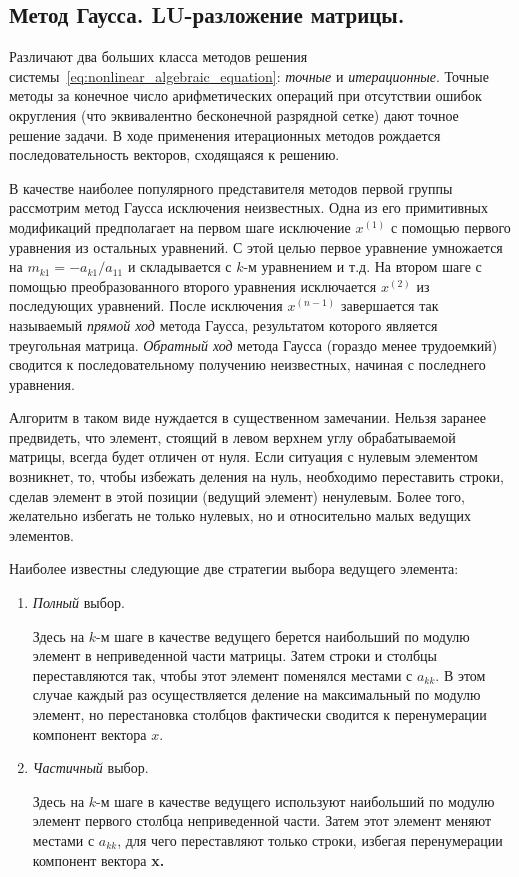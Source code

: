 \documentclass[../../calc-math-exam-2023.tex]{subfiles}
\begin{document}
    \subsection{Метод Гаусса. \textbf{LU}-разложение матрицы.}
    Различают два больших класса методов решения системы~\eqref{eq:nonlinear_algebraic_equation}: \emph{точные} и
    \emph{итерационные}. Точные методы за конечное число арифметических операций при отсутствии ошибок округления
    (что эквивалентно бесконечной разрядной сетке) дают точное решение задачи. В ходе применения итерационных методов
    рождается последовательность векторов, сходящаяся к решению.

    В качестве наиболее популярного представителя методов первой группы рассмотрим метод Гаусса исключения неизвестных.
    Одна из его примитивных модификаций предполагает на первом шаге исключение $\displaystyle x^{(1)}$ с помощью первого
    уравнения из остальных уравнений. С этой целью первое уравнение умножается на $m_{k1} = -a_{k1}/a_{11}$ и
    складывается с $k$-м уравнением и т.д. На втором шаге с помощью преобразованного второго уравнения исключается
    $\displaystyle x^{(2)}$ из последующих уравнений. После исключения $\displaystyle x^{(n-1)}$ завершается так
    называемый \emph{прямой ход} метода Гаусса, результатом которого является треугольная матрица. \emph{Обратный ход}
    метода Гаусса (гораздо менее трудоемкий) сводится к последовательному получению неизвестных, начиная с последнего
    уравнения.

    Алгоритм в таком виде нуждается в существенном замечании. Нельзя заранее предвидеть, что элемент, стоящий в левом
    верхнем углу обрабатываемой матрицы, всегда будет отличен от нуля. Если ситуация с нулевым элементом возникнет, то,
    чтобы избежать деления на нуль, необходимо переставить строки, сделав элемент в этой позиции (ведущий элемент)
    ненулевым. Более того, желательно избегать не только нулевых, но и относительно малых ведущих элементов.

    Наиболее известны следующие две стратегии выбора ведущего элемента:
    \begin{enumerate}
        \item \emph{Полный} выбор.

        Здесь на $k$-м шаге в качестве ведущего берется наибольший по модулю элемент в неприведенной части матрицы.
        Затем строки и столбцы переставляются так, чтобы этот элемент поменялся местами с $a_{kk}$. В этом случае
        каждый раз осуществляется деление на максимальный по модулю элемент, но перестановка столбцов фактически
        сводится к перенумерации компонент вектора $x$.

        \item \emph{Частичный} выбор.

        Здесь на $k$-м шаге в качестве ведущего используют наибольший по модулю элемент первого столбца неприведенной
        части. Затем этот элемент меняют местами с $a_{kk}$, для чего переставляют только строки, избегая перенумерации
        компонент вектора \bf{x}.
    \end{enumerate}
\end{document}
